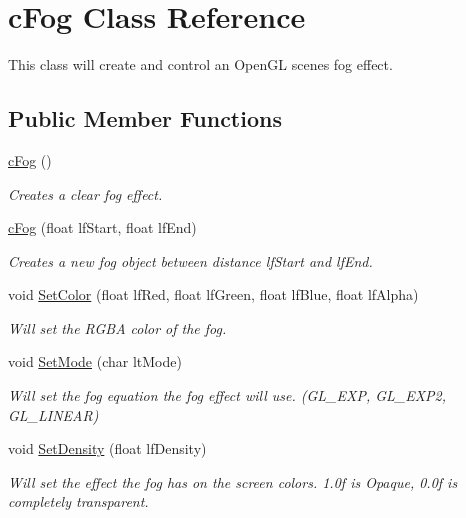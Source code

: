 \hypertarget{classc_fog}{
\section{cFog Class Reference}
\label{classc_fog}
}


This class will create and control an OpenGL scenes fog effect.  


\subsection*{Public Member Functions}
\begin{DoxyCompactItemize}
\item 
\hyperlink{classc_fog_a8d87f9ec7b741a27236b89f134f46104}{cFog} ()
\begin{DoxyCompactList}\small\item\em Creates a clear fog effect. \item\end{DoxyCompactList}\item 
\hyperlink{classc_fog_a546279d0cae73376c9b254b727c32a50}{cFog} (float lfStart, float lfEnd)
\begin{DoxyCompactList}\small\item\em Creates a new fog object between distance lfStart and lfEnd. \item\end{DoxyCompactList}\item 
void \hyperlink{classc_fog_a6df07427d17c1ebae3d9fda3a8c35071}{SetColor} (float lfRed, float lfGreen, float lfBlue, float lfAlpha)
\begin{DoxyCompactList}\small\item\em Will set the RGBA color of the fog. \item\end{DoxyCompactList}\item 
void \hyperlink{classc_fog_a295ed5f6c4d99814a14740a4527d090f}{SetMode} (char ltMode)
\begin{DoxyCompactList}\small\item\em Will set the fog equation the fog effect will use. (GL\_\-EXP, GL\_\-EXP2, GL\_\-LINEAR) \item\end{DoxyCompactList}\item 
void \hyperlink{classc_fog_a0de4a3634f298570163182df50813e90}{SetDensity} (float lfDensity)
\begin{DoxyCompactList}\small\item\em Will set the effect the fog has on the screen colors. 1.0f is Opaque, 0.0f is completely transparent. \item\end{DoxyCompactList}\item 

\end{DoxyCompactItemize}
